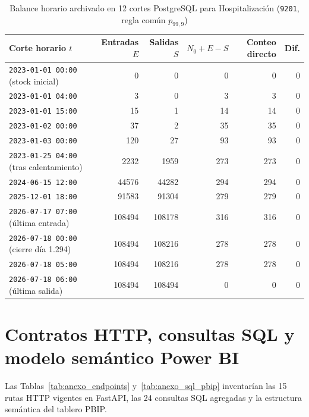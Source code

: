 \begin{table}[t]
\caption{Balance horario archivado en 12 cortes PostgreSQL para Hospitalización (\texttt{9201}, regla común $p_{99{,}9}$)}
\label{tab:anexo_cortes_n0}
\centering
\scriptsize
\begin{tabularx}{\textwidth}{@{}Y r r r r r@{}}
\toprule
Corte horario $t$ & Entradas $E$ & Salidas $S$ & $N_0 + E - S$ & Conteo directo & Dif. \\
\midrule
\texttt{2023-01-01 00:00} (stock inicial) & 0 & 0 & 0 & 0 & 0 \\
\texttt{2023-01-01 04:00} & 3 & 0 & 3 & 3 & 0 \\
\texttt{2023-01-01 15:00} & 15 & 1 & 14 & 14 & 0 \\
\texttt{2023-01-02 00:00} & 37 & 2 & 35 & 35 & 0 \\
\texttt{2023-01-03 00:00} & 120 & 27 & 93 & 93 & 0 \\
\texttt{2023-01-25 04:00} (tras calentamiento) & \num{2232} & \num{1959} & 273 & 273 & 0 \\
\texttt{2024-06-15 12:00} & \num{44576} & \num{44282} & 294 & 294 & 0 \\
\texttt{2025-12-01 18:00} & \num{91583} & \num{91304} & 279 & 279 & 0 \\
\texttt{2026-07-17 07:00} (última entrada) & \num{108494} & \num{108178} & 316 & 316 & 0 \\
\texttt{2026-07-18 00:00} (cierre día 1.294) & \num{108494} & \num{108216} & 278 & 278 & 0 \\
\texttt{2026-07-18 05:00} & \num{108494} & \num{108216} & 278 & 278 & 0 \\
\texttt{2026-07-18 06:00} (última salida) & \num{108494} & \num{108494} & 0 & 0 & 0 \\
\bottomrule
\end{tabularx}
\end{table}

\section{Contratos HTTP, consultas SQL y modelo semántico Power BI}
\label{app:contratos_sql_pbip}

Las Tablas~\ref{tab:anexo_endpoints} y~\ref{tab:anexo_sql_pbip} inventarían las 15 rutas HTTP vigentes en FastAPI, las 24 consultas SQL agregadas y la estructura semántica del tablero PBIP.

